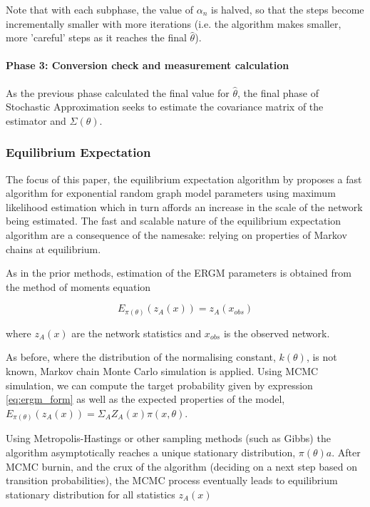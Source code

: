 Note that with each subphase, the value of $\alpha_n$ is halved, so that the steps become incrementally smaller with more iterations (i.e. the algorithm makes smaller, more 'careful' steps as it reaches the final $\hat{\theta}$).

\paragraph{Phase 3: Conversion check and measurement calculation}

As the previous phase calculated the final value for $\hat{\theta}$, the final phase of Stochastic Approximation seeks to estimate the covariance matrix of the estimator and $\Sigma(\theta)$. 


\subsubsection{Equilibrium Expectation}

The focus of this paper, the equilibrium expectation algorithm by \cite{eqexpectation} proposes a fast algorithm for exponential random graph model parameters using maximum likelihood estimation which in turn affords an increase in the scale of the network being estimated. The fast and scalable nature of the equilibrium expectation algorithm are a consequence of the namesake: relying on properties of Markov chains at equilibrium.

As in the prior methods, estimation of the ERGM parameters is obtained from the method of moments equation

\begin{equation}
E_{\pi(\theta)}(z_A(x)) = z_A(x_{obs})
\end{equation}

where $z_A(x)$ are the network statistics and $x_{obs}$ is the observed network. 

As before, where the distribution of the normalising constant, $k(\theta)$, is not known, Markov chain Monte Carlo simulation is applied. Using MCMC simulation, we can compute the target probability given by expression \ref{eq:ergm_form} as well as the expected properties of the model, $E_{\pi(\theta)}(z_A(x)) = \Sigma_AZ_A(x)\pi(x, \theta)$. 

Using Metropolis-Hastings or other sampling methods (such as Gibbs) the algorithm asymptotically reaches a unique stationary distribution, $\pi(\theta)a$. After MCMC burnin, and the crux of the algorithm (deciding on a next step based on transition probabilities), the MCMC process eventually leads to equilibrium stationary distribution for all statistics $z_A(x)$

